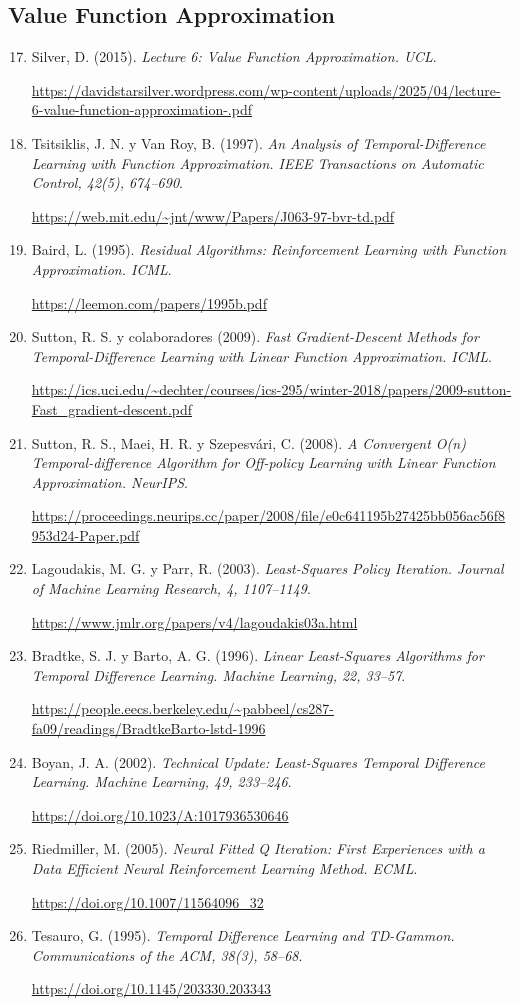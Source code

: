\documentclass[11pt,a4paper]{article}
\newcommand{\fuente}[4]{\item\label{#1} #2. \textit{#3}.\par{\small\raggedright\url{#4}\par}}
\begin{document}
\subsection*{Value Function Approximation}
\begin{enumerate}
\setcounter{enumi}{16}
\renewcommand{\labelenumi}{[\arabic{enumi}]}
\setlength{\itemsep}{0.7em}
\fuente{f:silvervfa}{Silver, D. (2015)}{Lecture 6: Value Function Approximation. UCL}{https://davidstarsilver.wordpress.com/wp-content/uploads/2025/04/lecture-6-value-function-approximation-.pdf}
\fuente{f:tsitsiklisvfa}{Tsitsiklis, J. N. y Van Roy, B. (1997)}{An Analysis of Temporal-Difference Learning with Function Approximation. IEEE Transactions on Automatic Control, 42(5), 674--690}{https://web.mit.edu/~jnt/www/Papers/J063-97-bvr-td.pdf}
\fuente{f:baird}{Baird, L. (1995)}{Residual Algorithms: Reinforcement Learning with Function Approximation. ICML}{https://leemon.com/papers/1995b.pdf}
\fuente{f:gtd2}{Sutton, R. S. y colaboradores (2009)}{Fast Gradient-Descent Methods for Temporal-Difference Learning with Linear Function Approximation. ICML}{https://ics.uci.edu/~dechter/courses/ics-295/winter-2018/papers/2009-sutton-Fast_gradient-descent.pdf}
\fuente{f:gtd}{Sutton, R. S., Maei, H. R. y Szepesvári, C. (2008)}{A Convergent O(n) Temporal-difference Algorithm for Off-policy Learning with Linear Function Approximation. NeurIPS}{https://proceedings.neurips.cc/paper/2008/file/e0c641195b27425bb056ac56f8953d24-Paper.pdf}
\fuente{f:lspi}{Lagoudakis, M. G. y Parr, R. (2003)}{Least-Squares Policy Iteration. Journal of Machine Learning Research, 4, 1107--1149}{https://www.jmlr.org/papers/v4/lagoudakis03a.html}
\fuente{f:lstd}{Bradtke, S. J. y Barto, A. G. (1996)}{Linear Least-Squares Algorithms for Temporal Difference Learning. Machine Learning, 22, 33--57}{https://people.eecs.berkeley.edu/~pabbeel/cs287-fa09/readings/BradtkeBarto-lstd-1996}
\fuente{f:boyan}{Boyan, J. A. (2002)}{Technical Update: Least-Squares Temporal Difference Learning. Machine Learning, 49, 233--246}{https://doi.org/10.1023/A:1017936530646}
\fuente{f:nfq}{Riedmiller, M. (2005)}{Neural Fitted Q Iteration: First Experiences with a Data Efficient Neural Reinforcement Learning Method. ECML}{https://doi.org/10.1007/11564096_32}
\fuente{f:tesauro}{Tesauro, G. (1995)}{Temporal Difference Learning and TD-Gammon. Communications of the ACM, 38(3), 58--68}{https://doi.org/10.1145/203330.203343}
\end{enumerate}
\end{document}
